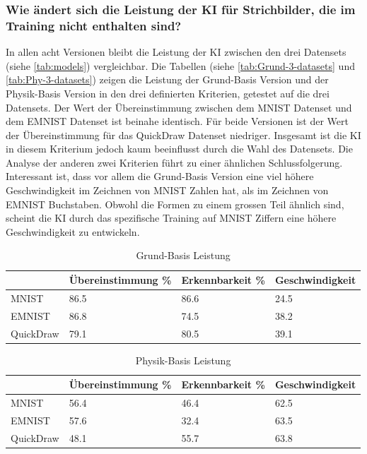\subsubsection*{Wie ändert sich die Leistung der KI für Strichbilder, die im Training nicht enthalten sind?}\label{subsub:d_frage_unter_5}
In allen acht Versionen bleibt die Leistung der KI zwischen den drei Datensets
(siehe \autoref{tab:models}) vergleichbar. Die Tabellen (siehe \autoref{tab:Grund-3-datasets} und \autoref{tab:Phy-3-datasets})
zeigen die Leistung der Grund-Basis Version und der
Physik-Basis Version in den drei definierten Kriterien, getestet auf die drei
Datensets. Der Wert der Übereinstimmung zwischen dem MNIST Datenset und dem
EMNIST Datenset ist beinahe identisch. Für beide Versionen ist der Wert der
Übereinstimmung für das QuickDraw Datenset niedriger. Insgesamt ist die KI in
diesem Kriterium jedoch kaum beeinflusst durch die Wahl des Datensets. Die
Analyse der anderen zwei Kriterien führt zu einer ähnlichen Schlussfolgerung.
Interessant ist, dass vor allem die Grund-Basis Version eine viel höhere
Geschwindigkeit im Zeichnen von MNIST Zahlen hat, als im Zeichnen von EMNIST
Buchstaben. Obwohl die Formen zu einem grossen Teil ähnlich sind, scheint die KI durch
das spezifische Training auf MNIST Ziffern eine höhere Geschwindigkeit zu
entwickeln.
 
\begin{table}[!ht]
   \centering
   \caption{Grund-Basis Leistung}\label{tab:Grund-3-datasets}
   \begin{tabular}{|l|l|l|l|}
       \hline
           ~ & Übereinstimmung \% & Erkennbarkeit \% & Geschwindigkeit \\ \hline
           MNIST & 86.5 & 86.6 & 24.5 \\ \hline
           EMNIST & 86.8 & 74.5 & 38.2 \\ \hline
           QuickDraw & 79.1 & 80.5 & 39.1 \\ \hline 
       \end{tabular}
\end{table}
 
\begin{table}[!ht]
   \centering
   \caption{Physik-Basis Leistung}\label{tab:Phy-3-datasets}
   \begin{tabular}{|l|l|l|l|}
       \hline
           ~ & Übereinstimmung \% & Erkennbarkeit \% & Geschwindigkeit \\ \hline
           MNIST  & 56.4 & 46.4 & 62.5 \\ \hline
           EMNIST & 57.6 & 32.4 & 63.5 \\ \hline
           QuickDraw & 48.1 & 55.7 & 63.8 \\ \hline
       \end{tabular}
\end{table}
 
